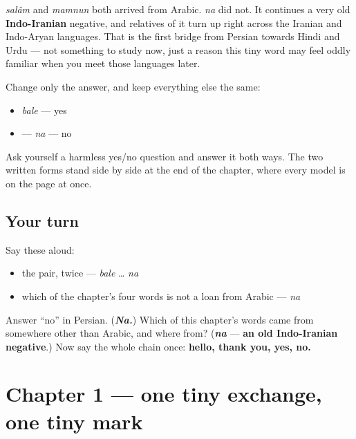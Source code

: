 \begin{cousinweb}
\emph{salâm} and \emph{mamnun} both arrived from Arabic. \emph{na} did not. It continues a very old \textbf{Indo-Iranian} negative, and relatives of it turn up right across the Iranian and Indo-Aryan languages. That is the first bridge from Persian towards Hindi and Urdu — not something to study now, just a reason this tiny word may feel oddly familiar when you meet those languages later.
\end{cousinweb}

\begin{culture}
Change only the answer, and keep everything else the same:

\begin{itemize}
\raggedright
  \item \emph{bale} — yes
  \item \textbf{} — \emph{na} — no
\end{itemize}

Ask yourself a harmless yes/no question and answer it both ways. The two written forms stand side by side at the end of the chapter, where every model is on the page at once.
\end{culture}

\subsection*{Your turn}
Say these aloud:

\begin{itemize}
\raggedright
  \item the pair, twice — \emph{bale} … \emph{na}
  \item which of the chapter's four words is not a loan from Arabic — \emph{na}
\end{itemize}

\begin{tcolorbox}[breakable,colback=teal!4,colframe=teal!35!black,title={Before you move on}]
Answer “no” in Persian. (\emph{\textbf{Na.}}) Which of this chapter's words came from somewhere other than Arabic, and where from? (\emph{\textbf{na}} — \textbf{an old Indo-Iranian negative}.) Now say the whole chain once: \textbf{hello, thank you, yes, no.}
\end{tcolorbox}
\section[Practice]{Chapter 1 — one tiny exchange, one tiny mark}

